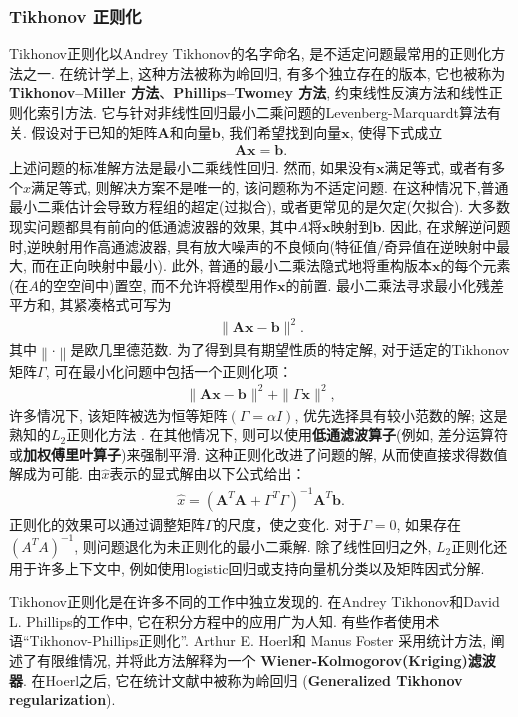 \subsubsection{Tikhonov 正则化}
Tikhonov正则化以Andrey Tikhonov的名字命名, 是不适定问题最常用的正则化方法之一.
在统计学上, 这种方法被称为岭回归, 有多个独立存在的版本, 它也被称为\textbf{Tikhonov–Miller 方法}、\textbf{Phillips–Twomey 方法}, 约束线性反演方法和线性正则化索引方法. 
它与针对非线性回归最小二乘问题的Levenberg-Marquardt算法有关.
假设对于已知的矩阵$\bm A$和向量$\bm b$, 我们希望找到向量$\bm{x}$, 使得下式成立
\begin{align}
    \bm A\bm {x} =\bm {b}.
\end{align}
上述问题的标准解方法是最小二乘线性回归. 然而, 如果没有$\bm x$满足等式, 或者有多个$\displaystyle x$满足等式, 则解决方案不是唯一的, 该问题称为不适定问题.
在这种情况下,普通最小二乘估计会导致方程组的超定(过拟合), 或者更常见的是欠定(欠拟合).
大多数现实问题都具有前向的低通滤波器的效果, 其中$A$将$\bm{x}$映射到$\bm{b}$.
因此, 在求解逆问题时,逆映射用作高通滤波器, 具有放大噪声的不良倾向(特征值/奇异值在逆映射中最大, 而在正向映射中最小).
此外, 普通的最小二乘法隐式地将重构版本$\bm{x}$的每个元素(在$A$的空空间中)置空, 而不允许将模型用作$\bm{x}$的前置.
最小二乘法寻求最小化残差平方和, 其紧凑格式可写为
\begin{align}
    \|\bm A\bm {x} -\bm {b} \|^{2}.
\end{align}
其中$\left\|\cdot\right\|$是欧几里德范数. 为了得到具有期望性质的特定解, 对于适定的Tikhonov矩阵$\Gamma$, 可在最小化问题中包括一个正则化项：
\begin{align}
    \|\bm A\bm {x} -\bm {b} \|^{2}+\|\Gamma \bm {x} \|^{2},
\end{align}
许多情况下, 该矩阵被选为恒等矩阵$(\Gamma=\alpha I)$, 优先选择具有较小范数的解; 这是熟知的$L_2$正则化方法 \cite{Ng2004-32636}.
在其他情况下, 则可以使用\textbf{低通滤波算子}(例如, 差分运算符或\textbf{加权傅里叶算子})来强制平滑.
这种正则化改进了问题的解, 从而使直接求得数值解成为可能. 由$\hat{x}$表示的显式解由以下公式给出：
\begin{align}
    {\hat {x}}=(\bm A^{T}\bm A+\Gamma ^{T}\Gamma )^{-1}\bm A^{T}\bm {b}.
\end{align}
正则化的效果可以通过调整矩阵$\Gamma$的尺度，使之变化. 对于$\Gamma=0$, 如果存在$(A^TA)^{-1}$, 则问题退化为未正则化的最小二乘解.
除了线性回归之外, $L_2$正则化还用于许多上下文中, 例如使用logistic回归或支持向量机分类\cite{Fan2008LIBLINEAR}以及矩阵因式分解\cite{Guan2012Online}.
\begin{remark}
Tikhonov正则化是在许多不同的工作中独立发现的. 在Andrey Tikhonov和David L. Phillips的工作中, 它在积分方程中的应用广为人知.
有些作者使用术语“Tikhonov-Phillips正则化”. Arthur E. Hoerl和 Manus Foster 采用统计方法, 阐述了有限维情况, 并将此方法解释为一个 \textbf{Wiener-Kolmogorov(Kriging)滤波器}.
在Hoerl之后, 它在统计文献中被称为岭回归 (\textbf{Generalized Tikhonov regularization}).
\end{remark}


